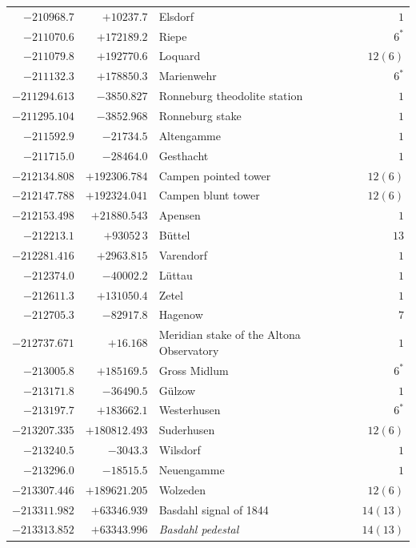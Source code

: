 \begin{center}
\begin{tabular}{r|r|p{170pt}|r}
\(-210968.7\)&\(+10237.7\)&Elsdorf&\(1\)\\
\(-211070.6\)&\(+172189.2\)&Riepe&\(6^{*}\)\\
\(-211079.8\)&\(+192770.6\)&Loquard&\(12 (6)\)\\
\(-211132.3\)&\(+178850.3\)&Marienwehr&\(6^{*}\)\\
\(-211294.613\)&\(-3850.827\)&Ronneburg theodolite station&\(1\)\\
\(-211295.104\)&\(-3852.968\)&Ronneburg stake&\(1\)\\
\(-211592.9\)&\(-21734.5\)&Altengamme&\(1\)\\
\(-211715.0\)&\(-28464.0\)&Gesthacht&\(1\)\\
\(-212134.808\)&\(+192306.784\)&Campen pointed tower&\(12 (6)\)\\
\(-212147.788\)&\(+192324.041\)&Campen blunt tower&\(12 (6)\)\\
\(-212153.498\)&\(+21880.543\)&Apensen&\(1\)\\
\(-212213.1\)&\(+93052\,3\)&Büttel&\(13\)\\
\(-212281.416\)&\(+2963.815\)&Varendorf&\(1\)\\
\(-212374.0\)&\(-40002.2\)&Lüttau&\(1\)\\
\(-212611.3\)&\(+131050.4\)&Zetel&\(1\)\\
\(-212705.3\)&\(-82917.8\)&Hagenow&\(7\)\\
\(-212737.671\)&\(+16.168\)&Meridian stake of the Altona Observatory&\(1\)\\
\(-213005.8\)&\(+185169.5\)&Gross Midlum&\(6^{*}\)\\
\(-213171.8\)&\(-36490.5\)&Gülzow&\(1\)\\
\(-213197.7\)&\(+183662.1\)&Westerhusen&\(6^{*}\)\\
\(-213207.335\)&\(+180812.493\)&Suderhusen&\(12 (6)\)\\
\(-213240.5\)&\(-3043.3\)&Wilsdorf&\(1\)\\
\(-213296.0\)&\(-18515.5\)&Neuengamme&\(1\)\\
\(-213307.446\)&\(+189621.205\)&Wolzeden&\(12 (6)\)\\
\(-213311.982\)&\(+63346.939\)&Basdahl signal of 1844&\(14(13)\)\\
\(-213313.852\)&\(+63343.996\)&\textit{Basdahl pedestal}&\(14(13)\)\\
\hline\end{tabular}\endgroup\end{center}
